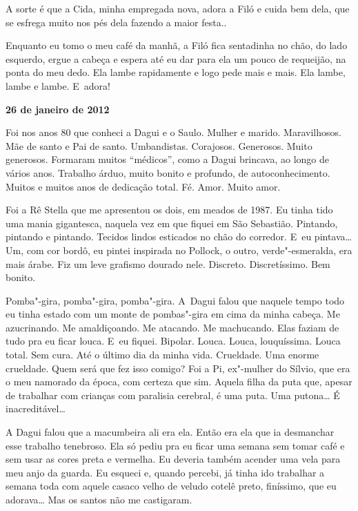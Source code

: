 A sorte é que a Cida, minha empregada nova, adora a Filó e cuida bem
dela, que se esfrega muito nos pés dela fazendo a maior festa..

Enquanto eu tomo o meu café da manhã, a Filó fica sentadinha no chão, do
lado esquerdo, ergue a cabeça e espera até eu dar para ela um pouco de
requeijão, na ponta do meu dedo. Ela lambe rapidamente e logo pede mais
e mais. Ela lambe, lambe e lambe. E~adora!

\begin{center}\asterisc{}\end{center}

\begin{flushright}\textbf{26 de janeiro de 2012}\end{flushright}


Foi nos anos 80 que conheci a Dagui e o Saulo. Mulher e marido.
Maravilhosos. Mãe de santo e Pai de santo. Umbandistas. Corajosos.
Generosos. Muito generosos. Formaram muitos ``médicos'', como a Dagui
brincava, ao longo de vários anos. Trabalho árduo, muito bonito e
profundo, de autoconhecimento. Muitos e muitos anos de dedicação total.
Fé. Amor. Muito amor.

Foi a Rê Stella que me apresentou os dois, em meados de 1987. Eu tinha
tido uma mania gigantesca, naquela vez em que fiquei em São Sebastião.
Pintando, pintando e pintando. Tecidos lindos esticados no chão do
corredor. E~eu pintava… Um, com cor bordô, eu pintei inspirada no
Pollock, o outro, verde"-esmeralda, era mais árabe. Fiz um leve grafismo
dourado nele. Discreto. Discretíssimo. Bem bonito.

Pomba"-gira, pomba"-gira, pomba"-gira. A~Dagui falou que naquele tempo todo
eu tinha estado com um monte de pombas"-gira em cima da minha cabeça. Me
azucrinando. Me amaldiçoando. Me atacando. Me machucando. Elas faziam de
tudo pra eu ficar louca. E~eu fiquei. Bipolar. Louca. Louca,
louquíssima. Louca total. Sem cura. Até o último dia da minha vida.
Crueldade. Uma enorme crueldade. Quem será que fez isso comigo? Foi a
Pi, ex"-mulher do Sílvio, que era o meu namorado da época, com certeza
que sim. Aquela filha da puta que, apesar de trabalhar com crianças com
paralisia cerebral, é uma puta. Uma putona… É
inacreditável…

A Dagui falou que a macumbeira ali era ela. Então era ela que ia
desmanchar esse trabalho tenebroso. Ela só pediu pra eu ficar uma semana
sem tomar café e sem usar as cores preta e vermelha. Eu deveria também
acender uma vela para meu anjo da guarda. Eu esqueci e, quando percebi,
já tinha ido trabalhar a semana toda com aquele casaco velho de veludo
cotelê preto, finíssimo, que eu adorava… Mas os santos não me
castigaram.

